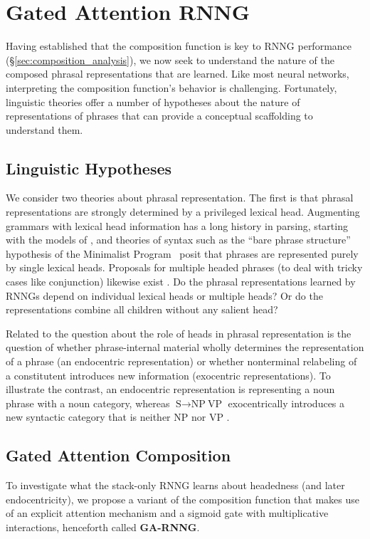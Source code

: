 \documentclass[11pt]{article}
\begin{document}
\section{Gated Attention RNNG}\label{sec:ga_rnng}



Having established that the composition function is key to RNNG performance 
 (\S\ref{sec:composition_analysis}), we now seek to understand the nature of the composed phrasal representations that are learned. Like most neural networks, interpreting the composition function's behavior is challenging. Fortunately, linguistic theories offer a number of hypotheses about the nature of representations of phrases that can provide a conceptual scaffolding to understand them.

\subsection{Linguistic Hypotheses}
We consider two theories about phrasal representation. The first is that phrasal representations are strongly determined by a privileged lexical head. Augmenting grammars with lexical head information has a long history in parsing, starting with the models of , and theories of syntax such as the ``bare phrase structure'' hypothesis of the Minimalist Program~\cite{chomsky:1993} posit that phrases are represented purely by single lexical heads. Proposals for multiple headed phrases (to deal with tricky cases like conjunction) likewise exist \cite{jackendoff:1977,keenan:1987}. Do the phrasal representations learned by RNNGs depend on individual lexical heads or multiple heads? Or do the representations combine all children without any salient head?
 
Related to the question about the role of heads in phrasal representation is the question of whether phrase-internal material wholly determines the representation of a phrase (an endocentric representation) or whether nonterminal relabeling of a constitutent introduces new information (exocentric representations). To illustrate the contrast, an endocentric representation is representing a noun phrase with a noun category, whereas $\text{S} \rightarrow \text{NP}\ \text{VP}$ exocentrically introduces a new syntactic category that is neither NP nor VP \cite{chomsky:1970}.

\subsection{Gated Attention Composition}
To investigate what the stack-only RNNG learns about headedness (and later endocentricity), we propose a variant of the composition function that makes use of an explicit attention mechanism \cite{bahdanau_15} and a sigmoid gate with multiplicative interactions, henceforth called \textbf{GA-RNNG}. 
\end{document}
